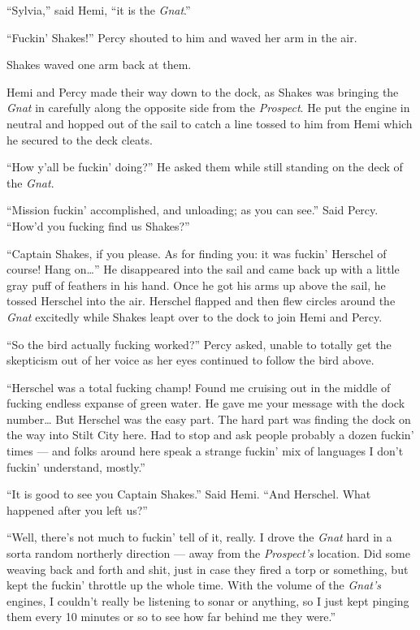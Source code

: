 \documentclass[
]{scrbook}
\begin{document}
``Sylvia,'' said Hemi, ``it is the \emph{Gnat}.''

``Fuckin' Shakes!'' Percy shouted to him and waved her arm in the air.

Shakes waved one arm back at them.

Hemi and Percy made their way down to the dock, as Shakes was bringing
the \emph{Gnat} in carefully along the opposite side from the
\emph{Prospect}. He put the engine in neutral and hopped out of the sail
to catch a line tossed to him from Hemi which he secured to the deck
cleats.

``How y'all be fuckin' doing?'' He asked them while still standing on
the deck of the \emph{Gnat}.

``Mission fuckin' accomplished, and unloading; as you can see.'' Said
Percy. ``How'd you fucking find us Shakes?''

``Captain Shakes, if you please. As for finding you: it was fuckin'
Herschel of course! Hang on\ldots{}'' He disappeared into the sail and
came back up with a little gray puff of feathers in his hand. Once he
got his arms up above the sail, he tossed Herschel into the air.
Herschel flapped and then flew circles around the \emph{Gnat} excitedly
while Shakes leapt over to the dock to join Hemi and Percy.

``So the bird actually fucking worked?'' Percy asked, unable to totally
get the skepticism out of her voice as her eyes continued to follow the
bird above.

``Herschel was a total fucking champ! Found me cruising out in the
middle of fucking endless expanse of green water. He gave me your
message with the dock number\ldots{} But Herschel was the easy part. The
hard part was finding the dock on the way into Stilt City here. Had to
stop and ask people probably a dozen fuckin' times --- and folks around
here speak a strange fuckin' mix of languages I don't fuckin'
understand, mostly.''

``It is good to see you Captain Shakes.'' Said Hemi. ``And Herschel.
What happened after you left us?''

``Well, there's not much to fuckin' tell of it, really. I drove the
\emph{Gnat} hard in a sorta random northerly direction --- away from the
\emph{Prospect's} location. Did some weaving back and forth and shit,
just in case they fired a torp or something, but kept the fuckin'
throttle up the whole time. With the volume of the \emph{Gnat's}
engines, I couldn't really be listening to sonar or anything, so I just
kept pinging them every 10 minutes or so to see how far behind me they
were.''
\end{document}
